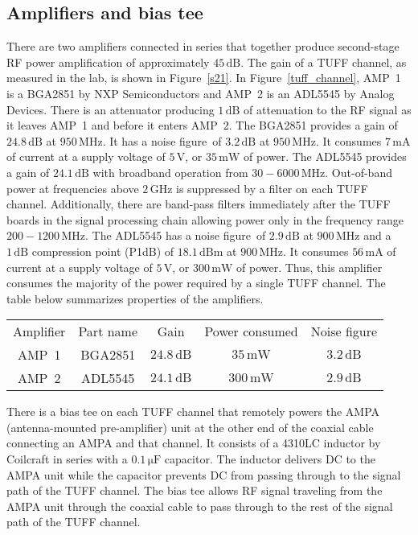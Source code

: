 \documentclass[preprint,12pt]{elsarticle}
\begin{document}
\subsection{Amplifiers and bias tee} 

There are two amplifiers connected in series that together 
produce second-stage RF power amplification of approximately $45\,\mathrm{dB}$. 
The gain of a TUFF channel, as measured in the lab, is shown in Figure~\ref{s21}. 
 In Figure~\ref{tuff_channel}, AMP~1 is a BGA2851 by NXP Semiconductors and 
AMP~2 is an ADL5545 by Analog Devices. 
There is an attenuator producing $1\,\mathrm{dB}$ of 
attenuation to the RF signal as it leaves
AMP~1 and before it enters AMP~2.
The BGA2851 provides a gain of $24.8\,\mathrm{dB}$ at $950\,\mbox{MHz}$. 
It has a noise figure~of $3.2\,\mathrm{dB}$ at $950\,\mbox{MHz}$. 
It consumes $7\,\mathrm{mA}$ of current at a supply voltage of $5\,\mathrm{V}$, 
or $35\,\mathrm{mW}$ of power.
The ADL5545 provides a gain of $24.1\,\mathrm{dB}$ with broadband operation from $30-6000\,\mbox{MHz}$.
Out-of-band power at frequencies above $2\,\mbox{GHz}$ is suppressed by a filter on each TUFF channel. 
Additionally, there are band-pass 
filters immediately after the TUFF boards in the signal processing chain allowing power only in the frequency range $200 - 1200\,\mbox{MHz}$. 
The ADL5545 has a noise figure~of $2.9\,\mathrm{dB}$ at $900\,\mbox{MHz}$ 
and a $1\,\mathrm{dB}$ compression point (P1dB) of $18.1\,\mathrm{dBm}$ at $900\,\mbox{MHz}$. 
It consumes $56\,\mathrm{mA}$ of current at a supply voltage of $5\,\mathrm{V}$, or $300\,\mathrm{mW}$ of power. 
Thus, this amplifier consumes the majority of the power required by a single TUFF channel.
The table below summarizes properties of the amplifiers.

\begin{center}
\begin{tabular}{ c c c c c}
 Amplifier & Part name & Gain & Power consumed & Noise figure\\
 AMP~1  &  BGA2851 &  $24.8\,\mathrm{dB}$  & $35\,\mathrm{mW}$ & $3.2\,\mathrm{dB}$\\ 
 AMP~2  & ADL5545  &  $24.1\,\mathrm{dB}$ &  $300\,\mathrm{mW}$ & $2.9\,\mathrm{dB}$\\  
\end{tabular}
\end{center}

There is a bias tee on each TUFF channel that 
remotely powers the AMPA (antenna-mounted pre-amplifier) unit at the other end of the coaxial cable connecting an AMPA and that channel. 
It consists of a 4310LC inductor by Coilcraft in series with a $0.1\,\mathrm{\mu F}$ capacitor. 
The inductor delivers DC to the AMPA unit while the capacitor prevents DC from passing through to the signal path of the TUFF channel. 
The bias tee allows RF signal traveling from the AMPA unit through the coaxial cable to pass 
through to the rest of the signal path of the TUFF channel. 
\end{document}
